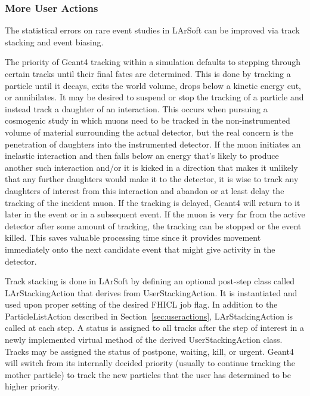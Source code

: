 \documentclass[12pt]{elsarticle}
\newcommand{\larsoft}{LArSoft }
\begin{document}
\begin{itemize}
\end{itemize}

\subsubsection{More User Actions}
\label{susubsec:trackstackingandeventbiasing}

The statistical errors on rare event studies in \larsoft can be improved via track stacking and event biasing.

The priority of Geant4 tracking within a simulation defaults to stepping through certain tracks
until their final fates are determined. This is done 
by tracking a particle until it decays, exits the world volume, drops below a kinetic
energy cut, or annihilates. It may be desired to suspend or stop 
the tracking of a particle and instead track a daughter of an interaction. 
This occurs when pursuing a cosmogenic study in which muons need to be tracked in 
the non-instrumented volume of material surrounding the actual detector, but the real concern is the penetration of daughters into the instrumented detector. If the muon initiates an inelastic interaction and then falls below 
an energy that's likely to produce another such interaction and/or it is kicked in a direction that makes
it unlikely that any further daughters would make it to the detector, it is wise to
track any daughters of interest from this interaction and abandon or at least delay the tracking of the incident muon.
If the tracking is delayed, Geant4 will return to it later in the event or in a subsequent event. If the muon is very far from the active detector after some amount of tracking, the tracking can be stopped or the event killed. This saves valuable processing time since it provides movement
immediately onto the next candidate event that might give activity in the detector.

Track stacking is done in \larsoft by defining an optional post-step class 
called LArStackingAction that derives from UserStackingAction. It is instantiated and used upon proper setting of the desired 
FHICL job flag. In addition to the ParticleListAction 
described in Section~\ref{sec:useractions}, LArStackingAction is called at each step.
A status is assigned to all 
tracks after the step of interest in a 
newly implemented virtual method of the derived UserStackingAction class. 
Tracks may be assigned the status of
postpone, waiting, kill, or urgent. Geant4 will switch from its internally decided priority (usually to continue tracking the mother particle) to track the new particles that
the user has determined to be higher priority. 
\end{document}
